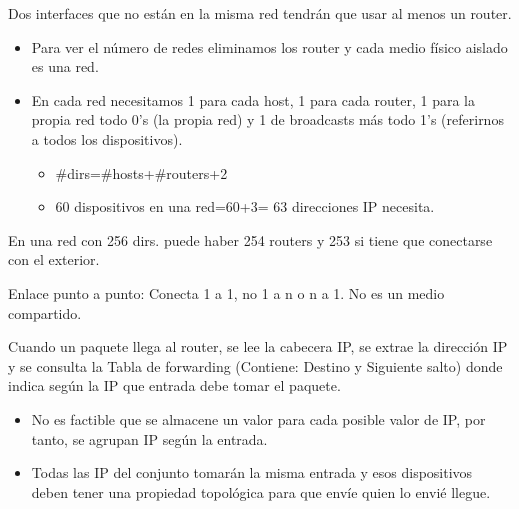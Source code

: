 \documentclass[12pt, twoside, openright]{report} %
\begin{document}
	Dos interfaces que no están en la misma red tendrán que usar al
    menos un router.

    \begin{itemize}
    \item
      Para ver el número de redes eliminamos los router y cada medio
      físico aislado es una red.
    \item
      En cada red necesitamos 1 para cada host, 1 para cada router, 1
      para la propia red todo 0's (la propia red) y 1 de broadcasts más
      todo 1's (referirnos a todos los dispositivos).

      \begin{itemize}
      \item
        \#dirs=\#hosts+\#routers+2
      \item
        60 dispositivos en una red=60+3= 63 direcciones IP necesita.
      \end{itemize}
    \end{itemize}

	En una red con 256 dirs. puede haber 254 routers y 253 si tiene que
    conectarse con el exterior.

	Enlace punto a punto: Conecta 1 a 1, no 1 a n o n a 1. No es un
    medio compartido.

	Cuando un paquete llega al router, se lee la cabecera IP, se extrae
    la dirección IP y se consulta la Tabla de forwarding (Contiene:
    Destino y Siguiente salto) donde indica según la IP que entrada debe
    tomar el paquete.

    \begin{itemize}
    \item
      No es factible que se almacene un valor para cada posible valor de
      IP, por tanto, se agrupan IP según la entrada.
    \item
      Todas las IP del conjunto tomarán la misma entrada y esos
      dispositivos deben tener una propiedad topológica para que envíe quien
      lo envié llegue.
    \end{itemize}
\end{document}
